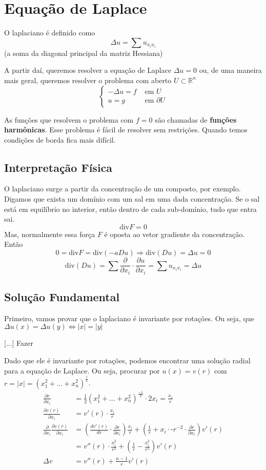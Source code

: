 \documentclass[11pt]{article}
\newcommand{\Rn}{{\mathbb{R}^n}}
\newcommand{\p}{\partial}
\newcommand{\pde}[2]{\frac{\p #1}{\p #2}}
\newcommand{\parentesis}[1]{\left(#1\right)}
\begin{document}
\section{Equação de Laplace}

O laplaciano é definido como \[ \Delta u = \sum u_{x_i x_i} \] (a soma da diagonal principal da matriz Hessiana)

A partir daí, queremos resolver a equação de Laplace \(\Delta u =0\) ou, de uma maneira mais geral, queremos resolver o problema com aberto \(U \subset \Rn\) \begin{equation}\label{problaplace}
	\begin{cases}
		-\Delta u = f &\text{ em } U\\
		u = g &\text{ em } \p U
	\end{cases}
\end{equation}

As funções que resolvem o problema com \(f=0\) são chamadas de \textbf{funções harmônicas}. Esse problema é fácil de resolver sem restrições. Quando temos condições de borda fica mais difícil.

\subsection*{Interpretação Física}

O laplaciano surge a partir da concentração de um composto, por exemplo. Digamos que exista um domínio com um sal em uma dada concentração. Se o sal está em equilíbrio no interior, então dentro de cada sub-domínio, tudo que entra sai. 
\[ \text{div} F = 0 \]
Mas, normalmente essa força \(F\) é oposta ao vetor gradiente da concentração. Então \[0 = \text{div} F = \text{div} (-a Du) \Rightarrow \text{div} (Du) = \Delta u = 0 \]
\[\text{div}(Du) = \sum \pde{}{x_i}\cdot \pde{u}{x_i} = \sum u_{x_ix_i} = \Delta u \]

\subsection{Solução Fundamental}

Primeiro, vamos provar que o laplaciano é invariante por rotações. Ou seja, que \(\Delta u(x) = \Delta u(y) \Leftrightarrow |x|=|y|\)

[...] Fazer

Dado que ele é invariante por rotações, podemos encontrar uma solução radial para a equação de Laplace. Ou seja, procurar por \(u(x)=v(r)\) com \(r=|x|=\left(x_1^2 + \ldots +x_n^2\right)^{\frac{1}{2}}\).
\begin{align*}
	\pde{r}{x_i} &= \frac{1}{2}\left(x_1^2 + \ldots + x_n^2\right)^{\frac{-1}{2}}\cdot 2x_i = \frac{x_i}{r}\\
	\pde{v(r)}{x_i} &= v'(r) \cdot \frac{x_i}{r}\\
	\pde{}{x_i}\pde{v(r)}{x_i} &= \parentesis{\frac{dv'(r)}{dr} \cdot \pde{r}{x_i}} \frac{x_i}{r} + \left(\frac{1}{r} + x_i \cdot \text{-}r^{-2}\cdot \pde{r}{x_i}\right)v'(r) \\
	&= v''(r) \cdot \frac{x_i^2}{r^2} + \left(\frac{1}{r}  -\frac{x_i^2}{r^3}\right)v'(r) \\
	\Delta v &= v''(r) + \frac{n-1}{r}v'(r)
\end{align*}
\end{document}
